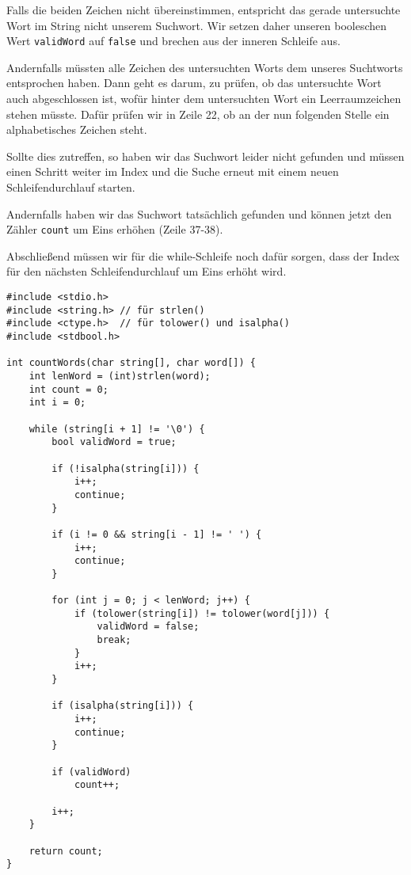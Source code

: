 Falls die beiden Zeichen nicht übereinstimmen, entspricht das gerade untersuchte
Wort im String nicht unserem Suchwort. Wir setzen daher unseren booleschen Wert
\texttt{validWord} auf \texttt{false} und brechen aus der inneren
Schleife aus.

Andernfalls müssten alle Zeichen des untersuchten Worts dem unseres Suchtworts
entsprochen haben. Dann geht es darum, zu prüfen, ob das untersuchte Wort auch
abgeschlossen ist, wofür hinter dem untersuchten Wort ein Leerraumzeichen stehen
müsste. Dafür prüfen wir in Zeile 22, ob an der nun folgenden Stelle ein
alphabetisches Zeichen steht.

Sollte dies zutreffen, so haben wir das Suchwort leider nicht gefunden und
müssen einen Schritt weiter im Index und die Suche erneut mit einem neuen
Schleifendurchlauf starten.

Andernfalls haben wir das Suchwort tatsächlich gefunden und können jetzt den
Zähler \texttt{count} um Eins erhöhen (Zeile 37-38).

Abschließend müssen wir für die while-Schleife noch dafür sorgen, dass der Index
für den nächsten Schleifendurchlauf um Eins erhöht wird.

\begin{verbatim}
#include <stdio.h>
#include <string.h> // für strlen()
#include <ctype.h>  // für tolower() und isalpha()
#include <stdbool.h>

int countWords(char string[], char word[]) {
    int lenWord = (int)strlen(word);
    int count = 0;
    int i = 0;

    while (string[i + 1] != '\0') {
        bool validWord = true;

        if (!isalpha(string[i])) {
            i++;
            continue;
        }

        if (i != 0 && string[i - 1] != ' ') {
            i++;
            continue;
        }

        for (int j = 0; j < lenWord; j++) {
            if (tolower(string[i]) != tolower(word[j])) {
                validWord = false;
                break;
            }
            i++;
        }

        if (isalpha(string[i])) {
            i++;
            continue;
        }

        if (validWord)
            count++;

        i++;
    }

    return count;
}
\end{verbatim}



